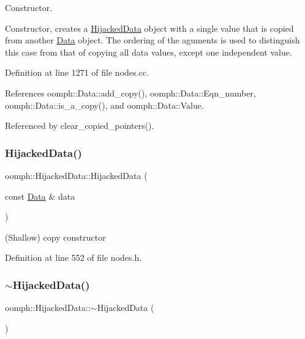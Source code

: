Constructor. 

Constructor, creates a \hyperlink{classoomph_1_1HijackedData}{Hijacked\+Data} object with a single value that is copied from another \hyperlink{classoomph_1_1Data}{Data} object. The ordering of the aguments is used to distinguish this case from that of copying all data values, except one independent value. 

Definition at line 1271 of file nodes.\+cc.



References oomph\+::\+Data\+::add\+\_\+copy(), oomph\+::\+Data\+::\+Eqn\+\_\+number, oomph\+::\+Data\+::is\+\_\+a\+\_\+copy(), and oomph\+::\+Data\+::\+Value.



Referenced by clear\+\_\+copied\+\_\+pointers().

\mbox{\label{classoomph_1_1HijackedData_a8f8c054b84f8f27443dea6094d7e9ce8}} 
\subsubsection{\texorpdfstring{Hijacked\+Data()}{HijackedData()}\hspace{0.1cm}{\footnotesize\ttfamily [2/2]}}
{\footnotesize\ttfamily oomph\+::\+Hijacked\+Data\+::\+Hijacked\+Data (\begin{DoxyParamCaption}\item[{const \hyperlink{classoomph_1_1Data}{Data} \&}]{data }\end{DoxyParamCaption})\hspace{0.3cm}{\ttfamily [inline]}}



(Shallow) copy constructor 



Definition at line 552 of file nodes.\+h.

\mbox{\label{classoomph_1_1HijackedData_a62d4c2d9f9dc30750c7a2fb414de2174}} 
\subsubsection{\texorpdfstring{$\sim$\+Hijacked\+Data()}{~HijackedData()}}
{\footnotesize\ttfamily oomph\+::\+Hijacked\+Data\+::$\sim$\+Hijacked\+Data (\begin{DoxyParamCaption}{ }\end{DoxyParamCaption})\hspace{0.3cm}{\ttfamily [inline]}}



